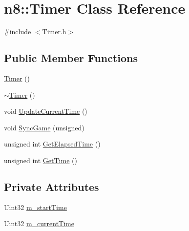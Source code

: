 \hypertarget{classn8_1_1_timer}{\section{n8\-:\-:Timer Class Reference}
\label{classn8_1_1_timer}
}


{\ttfamily \#include $<$Timer.\-h$>$}

\subsection*{Public Member Functions}
\begin{DoxyCompactItemize}
\item 
\hyperlink{classn8_1_1_timer_ab62468af51fb15209ca5a271060eb908}{Timer} ()
\item 
\hyperlink{classn8_1_1_timer_affebb151acd2dddc3b65ce8420b3029d}{$\sim$\-Timer} ()
\item 
void \hyperlink{classn8_1_1_timer_a00818f30eacc9007a72f6a54b3f1a005}{Update\-Current\-Time} ()
\item 
void \hyperlink{classn8_1_1_timer_a1f13b9e470602c87f38819d7d7e3af5e}{Sync\-Game} (unsigned)
\item 
unsigned int \hyperlink{classn8_1_1_timer_a60c0046328778c542f2b4676d864eabc}{Get\-Elapsed\-Time} ()
\item 
unsigned int \hyperlink{classn8_1_1_timer_aa3e91a189e9c7dc1b54b79a177398638}{Get\-Time} ()
\end{DoxyCompactItemize}
\subsection*{Private Attributes}
\begin{DoxyCompactItemize}
\item 
Uint32 \hyperlink{classn8_1_1_timer_a4ea04e459f66f523e443dad9cfb78241}{m\-\_\-start\-Time}
\item 
Uint32 \hyperlink{classn8_1_1_timer_af8d189a52bfd4dd1d00322602627327d}{m\-\_\-current\-Time}
\end{DoxyCompactItemize}


